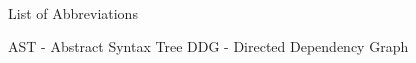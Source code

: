 
\renewcommand{\baselinestretch}{1}
\small\normalsize
\hbox{\ }

\vspace{-3em}

\begin{center}
\large{List of Abbreviations}
\end{center} 

AST - Abstract Syntax Tree
DDG - Directed Dependency Graph
